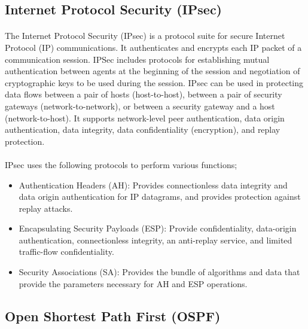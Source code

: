 \documentclass[12pt,a4paper]{report}
\begin{document}
\subsection{Internet Protocol Security (IPsec)}
\paragraph{}The Internet Protocol Security (IPsec) is a protocol suite for secure Internet Protocol (IP) communications. It authenticates and encrypts each IP packet of a communication session. IPSec includes protocols for establishing mutual authentication between agents at the beginning of the session and negotiation of cryptographic keys to be used during the session. IPsec can be used in protecting data flows between a pair of hosts (host-to-host), between a pair of security gateways (network-to-network), or between a security gateway and a host (network-to-host). It supports network-level peer authentication, data origin authentication, data integrity, data confidentiality (encryption), and replay protection.
\paragraph{}IPsec uses the following protocols to perform various functions;
\begin{itemize}
	\item Authentication Headers (AH): Provides connectionless data integrity and data origin authentication for IP datagrams, and provides protection against replay attacks.
	\item Encapsulating Security Payloads (ESP): Provide confidentiality, data-origin authentication, connectionless integrity, an anti-replay service, and limited traffic-flow confidentiality.
	\item Security Associations (SA): Provides the bundle of algorithms and data that provide the parameters necessary for AH and ESP operations.
\end{itemize}

\subsection{Open Shortest Path First (OSPF)}
\end{document}

